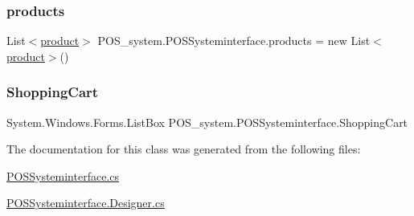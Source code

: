 \subsubsection{\texorpdfstring{products}{products}}
{\footnotesize\ttfamily List$<$\mbox{\hyperlink{class_p_o_s__system_1_1product}{product}}$>$ P\+O\+S\+\_\+system.\+P\+O\+S\+Systeminterface.\+products = new List$<$\mbox{\hyperlink{class_p_o_s__system_1_1product}{product}}$>$()}

\mbox{\label{class_p_o_s__system_1_1_p_o_s_systeminterface_a4155d18c7c9a958ad86a9a45c2943597}} 
\subsubsection{\texorpdfstring{Shopping\+Cart}{ShoppingCart}}
{\footnotesize\ttfamily System.\+Windows.\+Forms.\+List\+Box P\+O\+S\+\_\+system.\+P\+O\+S\+Systeminterface.\+Shopping\+Cart}



The documentation for this class was generated from the following files\+:\begin{DoxyCompactItemize}
\item 
\mbox{\hyperlink{_p_o_s_systeminterface_8cs}{P\+O\+S\+Systeminterface.\+cs}}\item 
\mbox{\hyperlink{_p_o_s_systeminterface_8_designer_8cs}{P\+O\+S\+Systeminterface.\+Designer.\+cs}}\end{DoxyCompactItemize}
